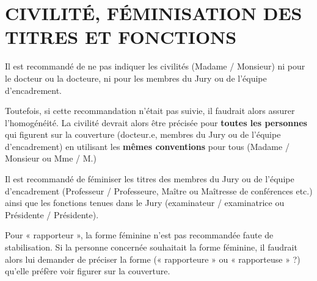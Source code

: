 \documentclass[french,12pt,a4paper]{book}
\begin{document}
\chapter{CIVILITÉ, FÉMINISATION DES TITRES ET FONCTIONS}
Il est recommandé de ne pas indiquer les civilités (Madame / Monsieur) ni pour le docteur ou la docteure, ni pour les membres du Jury ou de l’équipe d’encadrement.\\ \par 
Toutefois, si cette recommandation n’était pas suivie, il faudrait alors assurer l’homogénéité. La civilité devrait alors être précisée pour \textbf{toutes les personnes} qui figurent sur la couverture (docteur.e, membres du Jury ou de l’équipe d’encadrement) en utilisant les \textbf{mêmes conventions} pour tous (Madame / Monsieur ou Mme / M.)\\ \par
Il est recommandé de féminiser les titres des membres du Jury ou de l’équipe d’encadrement (Professeur / Professeure, Maître ou Maîtresse de conférences etc.) ainsi que les fonctions tenues dans le Jury (examinateur / examinatrice ou Présidente / Présidente). \\ \par
Pour « rapporteur », la forme féminine n’est pas recommandée faute de stabilisation. Si la personne concernée souhaitait la forme féminine, il faudrait alors lui demander de préciser la forme (« rapporteure » ou « rapporteuse » ?) qu’elle préfère voir figurer sur la couverture.
\end{document}
